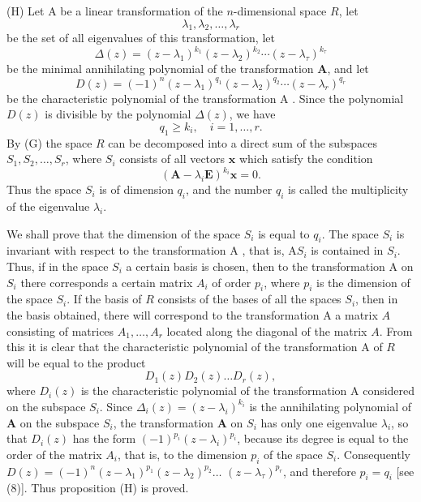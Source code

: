 \documentclass[10pt,a5paper]{book}
\theoremstyle{plain}
\theoremstyle{definition}
\theoremstyle{remark}
\begin{document}
(H) Let A be a linear transformation of the $n$-dimensional space $R$, let
\[
\lambda_{1}, \lambda_{2}, \ldots, \lambda_{r}
\]
be the set of all eigenvalues of this transformation, let
\[
\Delta(z)=\left(z-\lambda_{1}\right)^{k_{1}}\left(z-\lambda_{2}\right)^{k_{2}} \cdots\left(z-\lambda_{\tau}\right)^{k_{\tau}}
\]
be the minimal annihilating polynomial of the transformation $\mathbf{A}$, and let
\begin{equation*}
D(z)=(-1)^{n}\left(z-\lambda_{1}\right)^{q_{1}}\left(z-\lambda_{2}\right)^{q_{2}} \cdots\left(z-\lambda_{r}\right)^{q_{r}} \tag{8}
\end{equation*}
be the characteristic polynomial of the transformation A . Since the polynomial $D(z)$ is divisible by the polynomial $\Delta(z)$, we have
\[
q_{1} \geq k_{i}, \quad i=1, \ldots, r .
\]
By (G) the space $R$ can be decomposed into a direct sum of the subspaces $S_{1}, S_{2}, \ldots, S_{r}$, where $S_{i}$ consists of all vectors $\mathbf{x}$ which satisfy the condition
\[
\left(\mathbf{A}-\lambda_{i} \mathbf{E}\right)^{k_{i}} \mathbf{x}=0 .
\]
Thus the space $S_{i}$ is of dimension $q_{i}$, and the number $q_{i}$ is called the multiplicity of the eigenvalue $\lambda_{i}$.

We shall prove that the dimension of the space $S_{i}$ is equal to $q_{i}$. The space $S_{i}$ is invariant with respect to the transformation A , that is, $\mathrm{A} S_{i}$ is contained in $S_{i}$. Thus, if in the space $S_{i}$ a certain basis is chosen, then to the transformation A on $S_{i}$ there corresponds a certain matrix $A_{i}$
of order $p_{i}$, where $p_{i}$ is the dimension of the space $S_{i}$. If the basis of $R$ consists of the bases of all the spaces $S_{i}$, then in the basis obtained, there will correspond to the transformation A a matrix $A$ consisting of matrices $A_{1}, \ldots, A_{r}$ located along the diagonal of the matrix $A$. From this it is clear that the characteristic polynomial of the transformation A of $R$ will be equal to the product
\[
D_{1}(z) D_{2}(z) \ldots D_{r}(z),
\]
where $D_{i}(z)$ is the characteristic polynomial of the transformation A considered on the subspace $S_{i}$. Since $\Delta_{i}(z)=\left(z-\lambda_{i}\right)^{k_{i}}$ is the annihilating polynomial of $\mathbf{A}$ on the subspace $S_{i}$, the transformation $\mathbf{A}$ on $S_{i}$ has only one eigenvalue $\lambda_{i}$, so that $D_{i}(z)$ has the form $(-1)^{p_{i}}\left(z-\lambda_{i}\right)^{p_{i}}$, because its degree is equal to the order of the matrix $A_{i}$, that is, to the dimension $p_{i}$ of the space $S_{i}$. Consequently $D(z)=(-1)^{n}\left(z-\lambda_{1}\right)^{p_{1}}\left(z-\lambda_{2}\right)^{p_{2}} \ldots$ $\left(z-\lambda_{\tau}\right)^{p_{r}}$, and therefore $p_{i}=q_{i}$ [see (8)]. Thus proposition (H) is proved.
\end{document}
